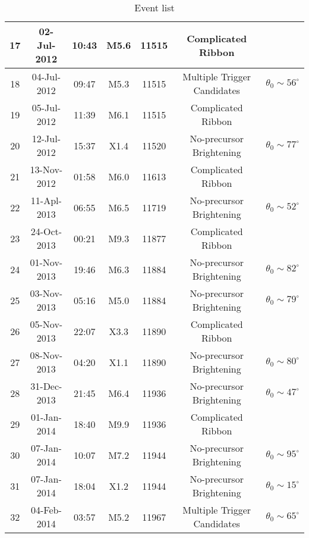 \documentclass[10pt,preprint2]{aastex}
\begin{document}
\begin{table*}
\begin{center}
\begin{tabular}{|c||c|c|c|c|c|c|}
	17 & 02-Jul-2012 & 10:43 & M5.6 & 11515 & Complicated Ribbon & \\  \hline
	18 & 04-Jul-2012 & 09:47 & M5.3 & 11515 & Multiple Trigger Candidates & $\theta_{0}\sim56^{\circ}$ \\ \hline
	19 & 05-Jul-2012 & 11:39 & M6.1 & 11515 & Complicated Ribbon & \\ \hline
	20 & 12-Jul-2012 & 15:37 & X1.4 & 11520 & No-precursor Brightening & $\theta_{0}\sim77^{\circ}$ \\ \hline
	21 & 13-Nov-2012 & 01:58 & M6.0 & 11613 & Complicated Ribbon & \\ \hline
	22 & 11-Apl-2013 & 06:55 & M6.5 & 11719 & No-precursor Brightening & $\theta_{0}\sim52^{\circ}$ \\ \hline
	23 & 24-Oct-2013 & 00:21 & M9.3 & 11877 & Complicated Ribbon & \\ \hline
	24 & 01-Nov-2013 & 19:46 & M6.3 & 11884 & No-precursor Brightening & $\theta_{0}\sim82^{\circ}$ \\ \hline
	25 & 03-Nov-2013 & 05:16 & M5.0 & 11884 & No-precursor Brightening & $\theta_{0}\sim79^{\circ}$ \\ \hline
	26 & 05-Nov-2013 & 22:07 & X3.3 & 11890 & Complicated Ribbon & \\ \hline
	27 & 08-Nov-2013 & 04:20 & X1.1 & 11890 & No-precursor Brightening & $\theta_{0}\sim80^{\circ}$ \\ \hline
	28 & 31-Dec-2013 & 21:45 & M6.4 & 11936 & No-precursor Brightening & $\theta_{0}\sim47^{\circ}$ \\ \hline
	29 & 01-Jan-2014 & 18:40 & M9.9 & 11936 & Complicated Ribbon & \\ \hline
	30 & 07-Jan-2014 & 10:07 & M7.2 & 11944 & No-precursor Brightening & $\theta_{0}\sim95^{\circ}$ \\ \hline
	31 & 07-Jan-2014 & 18:04 & X1.2 & 11944 & No-precursor Brightening & $\theta_{0}\sim15^{\circ}$ \\ \hline
	32 & 04-Feb-2014 & 03:57 & M5.2 & 11967 & Multiple Trigger Candidates & $\theta_{0}\sim65^{\circ}$ \\ \hline
\end{tabular}
\caption{Event list}
\label{table:event_list}
\end{center}
\end{table*}
\end{document}
